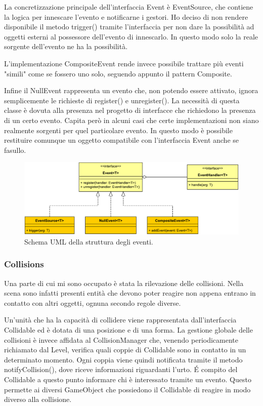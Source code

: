 \documentclass[a4paper,12pt]{report}
\begin{document}
La concretizzazione principale dell'interfaccia Event è EventSource, che contiene la logica per innescare l'evento e notificarne i gestori.
Ho deciso di non rendere disponibile il metodo trigger() tramite l'interfaccia per non dare la possibilità ad oggetti esterni al possessore dell'evento di innescarlo.
In questo modo solo la reale sorgente dell'evento ne ha la possibilità.

L'implementazione CompositeEvent rende invece possibile trattare più eventi "simili" come se fossero uno solo, seguendo appunto il pattern Composite.

Infine il NullEvent rappresenta un evento che, non potendo essere attivato, ignora semplicemente le richieste di register() e unregister().
La necessità di questa classe è dovuta alla presenza nel progetto di interfacce che richiedono la presenza di un certo evento.
Capita però in alcuni casi che certe implementazioni non siano realmente sorgenti per quel particolare evento.
In questo modo è possibile restituire comunque un oggetto compatibile con l'interfaccia Event anche se fasullo.

\begin{figure}[H]
\includegraphics[width=\linewidth]{img/events}
\caption{Schema UML della struttura degli eventi.}
\label{img:events}
\end{figure}

\subsubsection*{Collisions}

Una parte di cui mi sono occupato è stata la rilevazione delle collisioni.
Nella scena sono infatti presenti entità che devono poter reagire non appena entrano in contatto con altri oggetti, ognuna secondo regole diverse.

Un'unità che ha la capacità di collidere viene rappresentata dall'interfaccia Collidable ed è dotata di una posizione e di una forma.
La gestione globale delle collisioni è invece affidata al CollisionManager che, venendo periodicamente richiamato dal Level, verifica quali coppie di Collidable sono in contatto in un determinato momento.
Ogni coppia viene quindi notificata tramite il metodo notifyCollision(), dove riceve informazioni riguardanti l'urto.
É compito del Collidable a questo punto informare chi è interessato tramite un evento.
Questo permette ai diversi GameObject che possiedono il Collidable di reagire in modo diverso alla collisione.
\end{document}
